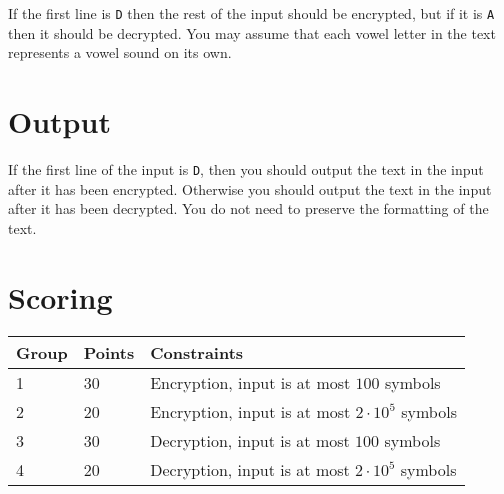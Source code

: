 If the first line is \texttt{D} then the rest of the input should be encrypted, but if it is \texttt{A} then it should be decrypted.
You may assume that each vowel letter in the text represents a vowel sound on its own.

\section*{Output}
If the first line of the input is \texttt{D}, then you should output the text in the input after it has been encrypted.
Otherwise you should output the text in the input after it has been decrypted.
You do not need to preserve the formatting of the text.

\section*{Scoring}
\begin{tabular}{|l|l|l|}
\hline
Group & Points & Constraints \\ \hline
1     & 30   & Encryption, input is at most $100$ symbols \\ \hline
2     & 20   & Encryption, input is at most $2 \cdot 10^5$ symbols \\ \hline
3     & 30   & Decryption, input is at most $100$ symbols \\ \hline
4     & 20   & Decryption, input is at most $2 \cdot 10^5$ symbols \\ \hline
\end{tabular}
